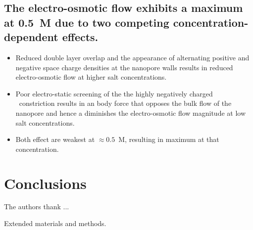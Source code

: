 \documentclass[journal=ancac3, manuscript=article, etalmode=truncate,maxauthors=0]{achemso}
\begin{document}
\subsection{The electro-osmotic flow exhibits a maximum at 0.5~M due to two competing concentration-dependent 
effects.}

\begin{itemize}
  \item Reduced double layer overlap and the appearance of alternating positive and negative space charge 
  densities at the nanopore walls results in reduced electro-osmotic flow at higher salt concentrations.
  \item Poor electro-static screening of the the highly negatively charged \trans\ constriction 
  results in an body force that opposes the bulk flow of the nanopore and hence a diminishes the 
  electro-osmotic flow magnitude at low salt concentrations.
  \item Both effect are weakest at $\approx0.5$~M, resulting in maximum at that concentration.
\end{itemize}

\section{Conclusions}\label{sect:conclusions}

\begin{acknowledgement}
The authors thank ...
\end{acknowledgement}


\begin{suppinfo}
	Extended materials and methods.
\end{suppinfo}


\newpage %


\newpage







%
\end{document}
